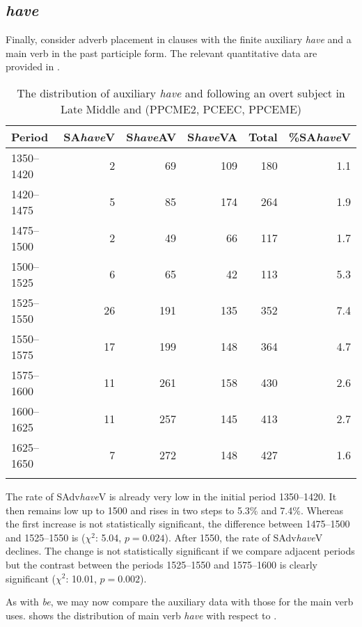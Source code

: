 \documentclass[output=paper]{langsci/langscibook}
\begin{document}
\subsection{\emph{have}}

Finally, consider adverb placement in clauses with the finite auxiliary
\emph{have} and a main verb in the past participle form. The relevant
quantitative data are provided in .

\begin{table}
\caption{The distribution of auxiliary \emph{have} and  following an
overt subject in Late Middle and  (PPCME2, PCEEC,
PPCEME)\label{tab:key:09.4}}
\begin{tabular}{lrrrrr}
\lsptoprule
{Period} & {SA\emph{have}V} & {S\emph{have}AV} & {S\emph{have}VA} & {Total} & {\%SA\emph{have}V}\\
\midrule
1350--1420 & 2 & 69 & 109 & 180 & 1.1\\
1420--1475 & 5 & 85 & 174 & 264 & 1.9\\
1475--1500 & 2 & 49 & 66 & 117 & 1.7\\
1500--1525 & 6 & 65 & 42 & 113 & 5.3\\
1525--1550 & 26 & 191 & 135 & 352 & 7.4\\
1550--1575 & 17 & 199 & 148 & 364 & 4.7\\
1575--1600 & 11 & 261 & 158 & 430 & 2.6\\
1600--1625 & 11 & 257 & 145 & 413 & 2.7\\
1625--1650 & 7 & 272 & 148 & 427 & 1.6\\
\lspbottomrule
\end{tabular}
\end{table}

The rate of SAdv\emph{have}V is already very low in the initial period
1350--1420. It then remains low up to 1500 and rises in two steps to 5.3\% and
7.4\%. Whereas the first increase is not statistically significant, the
difference between 1475--1500 and 1525--1550 is ($\chi^2$: 5.04, $p = 0.024$).
After 1550, the rate of SAdv\emph{have}V declines. The change is not
statistically significant if we compare adjacent periods but the contrast
between the periods 1525--1550 and 1575--1600 is clearly significant
($\chi^2$: 10.01, $p = 0.002$).

As with \emph{be}, we may now compare the auxiliary data with those for the
main verb uses.  shows the distribution of main verb
\emph{have} with respect to .
\end{document}

